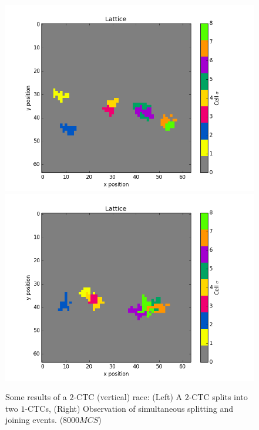 \documentclass[12pt]{article}
\begin{document}
\begin{figure}[h]
	\centering
	\includegraphics[scale=0.40]{img/2CTC-split}
	\includegraphics[scale=0.40]{img/2CTC-join}
	\caption{Some results of a $2$-CTC (vertical) race: (Left) A $2$-CTC splits into two $1$-CTCs, (Right) Observation of simultaneous splitting and joining events. ($8000MCS$)}
	\label{2CTC-horz}
\end{figure}
\end{document}
